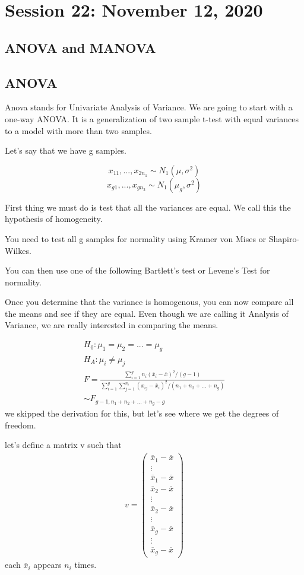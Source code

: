 \chapter{Session 22: November 12, 2020}
\section{ANOVA and MANOVA}
\section{ANOVA}
Anova stands for Univariate Analysis of Variance. We are going to start with a one-way ANOVA. It is a generalization of two sample t-test with equal variances to a model with more than two samples.

Let's say that we have g samples.

\[x_{11},...,x_{2n_1}\sim N_1(\mu,\sigma^2)\]
\[x_{g1},...,x_{gn_2}\sim N_1(\mu_g,\sigma^2)\]

First thing we must do is test that all the variances are equal. We call this the hypothesis of homogeneity.

You need to test all g samples for normality using Kramer von Mises or Shapiro-Wilkes. 

You can then use one of the following Bartlett's test or Levene's Test for normality.

Once you determine that the variance is homogenous, you can now compare all the means and see if they are equal. Even though we are calling it Analysis of Variance, we are really interested in comparing the means.

\begin{gather*}
    H_0: \mu_1 = \mu_2 =...=\mu_g \\
    H_A: \mu_i \neq \mu_j\\
    F = \frac{
    \displaystyle\sum_{i=1}^{g} n_i (\overline{x}_i-\overline{x})^2/(g-1)
    }{\displaystyle\sum_{i=1}^g\displaystyle\sum_{j=1}^{n_i}(x_{ij}-\overline{x}_i)^2/(n_1+n_2+...+n_g)}\\
    \sim F_{g-1,n_1+n_2+...+n_g-g}
\end{gather*}
we skipped the derivation for this, but let's see where we get the degrees of freedom.

let's define a matrix v such that
\begin{gather*}
    v = \begin{pmatrix}
    \overline{x}_1-\overline{x} 
    \\ \vdots\\
    \overline{x}_1-\overline{x}\\
    \overline{x}_2-\overline{x}
    \\ \vdots\\
    \overline{x}_2-\overline{x}
    \\ \vdots \\
    \overline{x}_g-\overline{x}
    \\ \vdots \\
    \overline{x}_g-\overline{x}
    \end{pmatrix}
\end{gather*}
each \(\overline{x}_i\) appears $n_i$ times.

